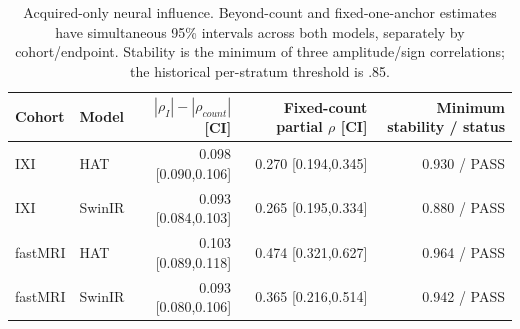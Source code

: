 \begin{table}[t]
\centering\small
\caption{Acquired-only neural influence. Beyond-count and fixed-one-anchor estimates have simultaneous 95\% intervals across both models, separately by cohort/endpoint. Stability is the minimum of three amplitude/sign correlations; the historical per-stratum threshold is .85.}
\label{tab:neural}
\setlength{\tabcolsep}{5pt}
\begin{tabular}{llrrr}\toprule
Cohort & Model & $|\rho_I|-|\rho_{count}|$ [CI] & Fixed-count partial $\rho$ [CI] & Minimum stability / status\\\midrule
IXI & HAT & 0.098 [0.090,0.106] & 0.270 [0.194,0.345] & 0.930 / PASS \\
IXI & SwinIR & 0.093 [0.084,0.103] & 0.265 [0.195,0.334] & 0.880 / PASS \\
fastMRI & HAT & 0.103 [0.089,0.118] & 0.474 [0.321,0.627] & 0.964 / PASS \\
fastMRI & SwinIR & 0.093 [0.080,0.106] & 0.365 [0.216,0.514] & 0.942 / PASS \\
\bottomrule\end{tabular}
\end{table}
